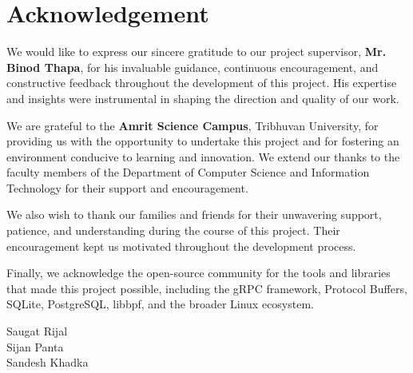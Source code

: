 \chapter*{Acknowledgement}

We would like to express our sincere gratitude to our project supervisor, \textbf{Mr. Binod Thapa}, for his invaluable guidance, continuous encouragement, and constructive feedback throughout the development of this project. His expertise and insights were instrumental in shaping the direction and quality of our work.

We are grateful to the \textbf{Amrit Science Campus}, Tribhuvan University, for providing us with the opportunity to undertake this project and for fostering an environment conducive to learning and innovation. We extend our thanks to the faculty members of the Department of Computer Science and Information Technology for their support and encouragement.

We also wish to thank our families and friends for their unwavering support, patience, and understanding during the course of this project. Their encouragement kept us motivated throughout the development process.

Finally, we acknowledge the open-source community for the tools and libraries that made this project possible, including the gRPC framework, Protocol Buffers, SQLite, PostgreSQL, libbpf, and the broader Linux ecosystem.

\vspace{1cm}

\begin{flushright}
Saugat Rijal \\
Sijan Panta \\
Sandesh Khadka
\end{flushright}

\clearpage
